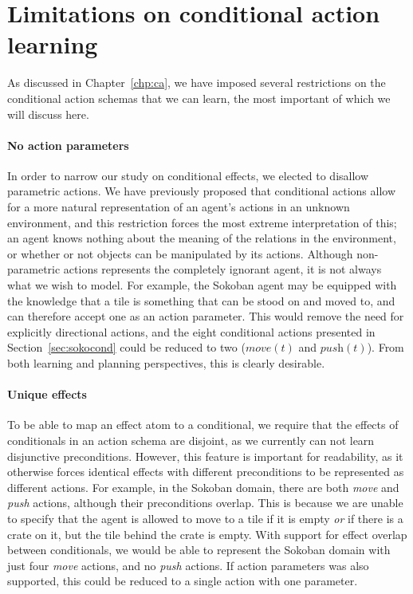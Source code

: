 \documentclass[Master.tex]{subfiles}
\begin{document}
\section{Limitations on conditional action learning}
As discussed in Chapter~\ref{chp:ca}, we have imposed several restrictions on the conditional action schemas that we can learn, the most important of which we will discuss here.

\paragraph*{No action parameters}
In order to narrow our study on conditional effects, we elected to disallow parametric actions. We have previously proposed that conditional actions allow for a more natural representation of an agent's actions in an unknown environment, and this restriction forces the most extreme interpretation of this; an agent knows nothing about the meaning of the relations in the environment, or whether or not objects can be manipulated by its actions. Although non-parametric actions represents the completely ignorant agent, it is not always what we wish to model. For example, the Sokoban agent may be equipped with the knowledge that a tile is something that can be stood on and moved to, and can therefore accept one as an action parameter. This would remove the need for explicitly directional actions, and the eight conditional actions presented in Section~\ref{sec:sokocond} could be reduced to two ($\textit{move}(t)$ and $\textit{push}(t)$). From both learning and planning perspectives, this is clearly desirable.

\paragraph*{Unique effects}
To be able to map an effect atom to a conditional, we require that the effects of conditionals in an action schema are disjoint, as we currently can not learn disjunctive preconditions. However, this feature is important for readability, as it otherwise forces identical effects with different preconditions to be represented as different actions. For example, in the Sokoban domain, there are both \textit{move} and \textit{push} actions, although their preconditions overlap. This is because we are unable to specify that the agent is allowed to move to a tile if it is empty \textit{or} if there is a crate on it, but the tile behind the crate is empty. With support for effect overlap between conditionals, we would be able to represent the Sokoban domain with just four \textit{move} actions, and no \textit{push} actions. If action parameters was also supported, this could be reduced to a single action with one parameter.
\end{document}
